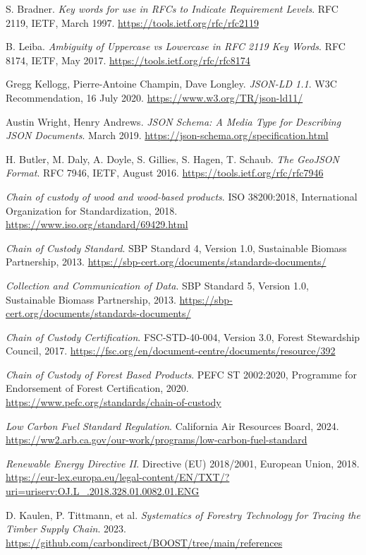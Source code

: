 \documentclass[12pt,a4paper]{article}
\begin{document}
\begin{thebibliography}{99}

S. Bradner. \textit{Key words for use in RFCs to Indicate Requirement Levels}. RFC 2119, IETF, March 1997. 
\url{https://tools.ietf.org/rfc/rfc2119}

B. Leiba. \textit{Ambiguity of Uppercase vs Lowercase in RFC 2119 Key Words}. RFC 8174, IETF, May 2017.
\url{https://tools.ietf.org/rfc/rfc8174}

Gregg Kellogg, Pierre-Antoine Champin, Dave Longley. \textit{JSON-LD 1.1}. W3C Recommendation, 16 July 2020.
\url{https://www.w3.org/TR/json-ld11/}

Austin Wright, Henry Andrews. \textit{JSON Schema: A Media Type for Describing JSON Documents}. March 2019.
\url{https://json-schema.org/specification.html}

H. Butler, M. Daly, A. Doyle, S. Gillies, S. Hagen, T. Schaub. \textit{The GeoJSON Format}. RFC 7946, IETF, August 2016.
\url{https://tools.ietf.org/rfc/rfc7946}

\textit{Chain of custody of wood and wood-based products}. ISO 38200:2018, International Organization for Standardization, 2018.
\url{https://www.iso.org/standard/69429.html}

\textit{Chain of Custody Standard}. SBP Standard 4, Version 1.0, Sustainable Biomass Partnership, 2013.
\url{https://sbp-cert.org/documents/standards-documents/}

\textit{Collection and Communication of Data}. SBP Standard 5, Version 1.0, Sustainable Biomass Partnership, 2013.
\url{https://sbp-cert.org/documents/standards-documents/}

\textit{Chain of Custody Certification}. FSC-STD-40-004, Version 3.0, Forest Stewardship Council, 2017.
\url{https://fsc.org/en/document-centre/documents/resource/392}

\textit{Chain of Custody of Forest Based Products}. PEFC ST 2002:2020, Programme for Endorsement of Forest Certification, 2020.
\url{https://www.pefc.org/standards/chain-of-custody}

\textit{Low Carbon Fuel Standard Regulation}. California Air Resources Board, 2024.
\url{https://ww2.arb.ca.gov/our-work/programs/low-carbon-fuel-standard}

\textit{Renewable Energy Directive II}. Directive (EU) 2018/2001, European Union, 2018.
\url{https://eur-lex.europa.eu/legal-content/EN/TXT/?uri=uriserv:OJ.L_.2018.328.01.0082.01.ENG}

D. Kaulen, P. Tittmann, et al. \textit{Systematics of Forestry Technology for Tracing the Timber Supply Chain}. 2023.
\url{https://github.com/carbondirect/BOOST/tree/main/references}

\end{thebibliography}
\end{document}
